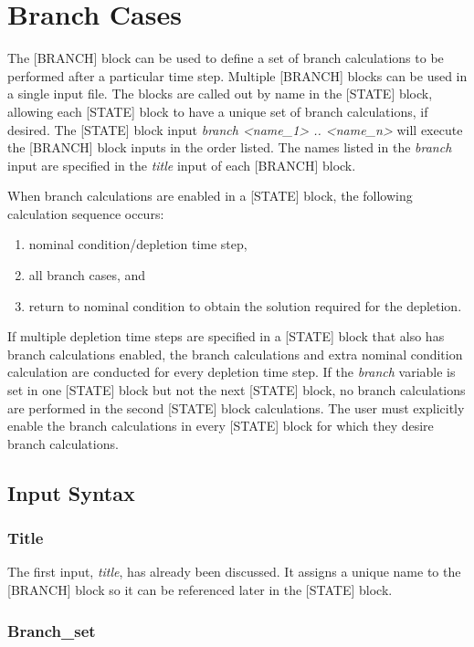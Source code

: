\section{Branch Cases}  \label{chap:branches}

The [BRANCH] block can be used to define a set of branch calculations to be performed after a particular time step.  Multiple [BRANCH] blocks can be used in a single input file.  The blocks are called out by name in the [STATE] block, allowing each [STATE] block to have a unique set of branch calculations, if desired.  The [STATE] block input \emph{branch <name\_1> .. <name\_n>} will execute the [BRANCH] block inputs in the order listed.  The names listed in the \emph{branch} input are specified in the \emph{title} input of each [BRANCH] block.

When branch calculations are enabled in a [STATE] block, the following calculation sequence occurs:
\begin{enumerate}[noitemsep]
    \item nominal condition/depletion time step,
    \item all branch cases, and
    \item return to nominal condition to obtain the solution required for the depletion.
\end{enumerate}
If multiple depletion time steps are specified in a [STATE] block that also has branch calculations enabled, the branch calculations and extra nominal condition calculation are conducted for every depletion time step.  If the \emph{branch} variable is set in one [STATE] block but not the next [STATE] block, no branch calculations are performed in the second [STATE] block calculations.  The user must explicitly enable the branch calculations in every [STATE] block for which they desire branch calculations.

\subsection{Input Syntax}

\subsubsection{Title}

The first input, \emph{title}, has already been discussed.  It assigns a unique name to the [BRANCH] block so it can be referenced later in the [STATE] block.

\subsubsection{Branch\_set}

